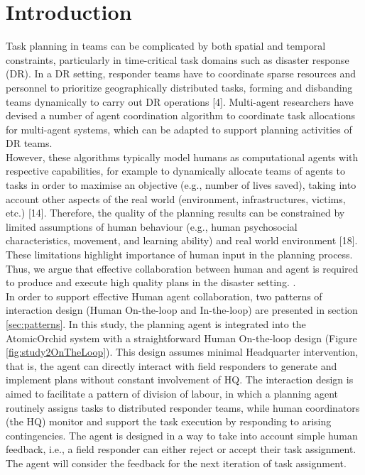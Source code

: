 \section{Introduction}\label{sec:studytwointroduction}
Task planning in teams can be complicated by both spatial and temporal constraints, particularly in time-critical task domains such as disaster response (DR). In a DR setting, responder teams have to coordinate sparse resources and personnel to prioritize geographically distributed tasks, forming and disbanding teams dynamically to carry out DR operations [4]. Multi-agent researchers have devised a number of agent coordination algorithm to coordinate task allocations for multi-agent systems, which can be adapted to support planning activities of DR teams. \\

However, these algorithms typically model humans as computational agents with respective capabilities, for example to dynamically allocate teams of agents to tasks in order to maximise an objective (e.g., number of lives saved), taking into account other aspects of the real world (environment, infrastructures, victims, etc.) [14]. Therefore, the quality of the planning results can be constrained by limited assumptions of human behaviour (e.g., human psychosocial characteristics, movement, and learning ability) and real world environment [18]. These limitations highlight importance of human input in the planning process. Thus, we argue that effective collaboration between human and agent is required to produce and execute high quality plans in the disaster setting. . \\

In order to support effective Human agent collaboration, two patterns of interaction design (Human On-the-loop and In-the-loop) are presented in section \ref{sec:patterns}. In this study, the planning agent is integrated into the AtomicOrchid system with a straightforward Human On-the-loop design (Figure \ref{fig:study2OnTheLoop}). This design assumes minimal Headquarter intervention, that is, the agent can directly interact with field responders to generate and implement plans without constant involvement of HQ. The interaction design is aimed to facilitate a pattern of division of labour, in which a planning agent routinely assigns tasks to distributed responder teams, while human coordinators (the HQ) monitor and support the task execution by responding to arising contingencies. The agent is designed in a way to take into account simple human feedback, i.e., a field responder can either reject or accept their task assignment. The agent will consider the feedback for the next iteration of task assignment.\\

